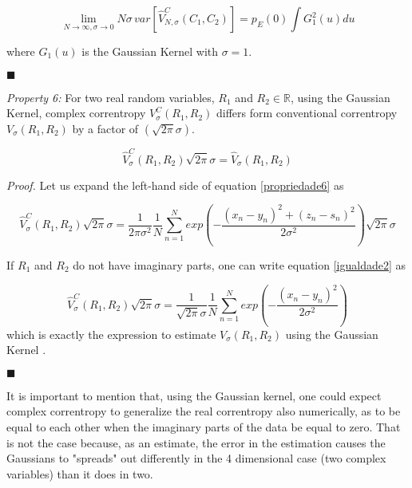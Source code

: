 \documentclass[preprint,12pt]{elsarticle}
\begin{document}
\begin{equation}
\lim_{N \rightarrow \infty, \sigma \rightarrow 0} N \sigma \, var[\hat{V}^C_{N,\sigma}(C_1,C_2) ] = p_{E}(0) \int G^2_{1}(u)du
\end{equation}

where $G_{1}(u)$ is the Gaussian Kernel with $\sigma = 1$.

\begin{flushright}
$\blacksquare$
\end{flushright}

\bigskip
\textit{Property 6:} For two real random variables, $R_1$ and $R_2 \in \mathbb{R}$, using the Gaussian Kernel, complex correntropy $V^{C}_{\sigma}(R_1,R_2)$ differs form conventional correntropy $V_{\sigma}(R_1,R_2)$ by a factor of $(\sqrt{2\pi}\sigma)$.


\begin{equation}\label{propriedade6}
\hat{V}^{C}_{\sigma}(R_1,R_2) \sqrt{2\pi}\sigma = \hat{V}_{\sigma}(R_1, R_2) 
\end{equation}

\textit{Proof.} Let us expand the left-hand side of equation \ref{propriedade6} as

\begin{equation}\label{igualdade2}
\hat{V}^{C}_{\sigma}(R_1,R_2) \sqrt{2\pi}\sigma = \frac{1}{2\pi\sigma^{2}} \frac{1}{N} \sum\limits_{n=1}^N exp \left ( -\frac{(x_{n} - y_{n})^{2} + (z_{n} - s_{n})^{2} }{2\sigma^2} \right ) \sqrt{2\pi}\sigma 
\end{equation}


If $R_1$ and $R_2$ do not have imaginary parts, one can write equation \ref{igualdade2} as

\begin{equation}
\hat{V}^{C}_{\sigma}(R_1,R_2) \sqrt{2\pi}\sigma = \frac{1}{\sqrt{2\pi}\sigma} \frac{1}{N} \sum\limits_{n=1}^N exp \left ( -\frac{(x_{n} - y_{n})^{2}  }{2\sigma^2} \right ) 
\end{equation}
which is exactly the expression to estimate $V_\sigma(R_{1},R_{2})$ using the Gaussian Kernel \citep{livroitl}. 
\begin{flushright}
$\blacksquare$
\end{flushright}


It is important to mention that, using the Gaussian kernel, one could expect complex correntropy to generalize the real correntropy also numerically, as to be equal to each other when the imaginary parts of the data be equal to zero. That is not the case because, as an estimate, the error in the estimation causes the Gaussians to "spreads" out differently in the 4 dimensional case (two complex variables) than it does in two.
\end{document}
